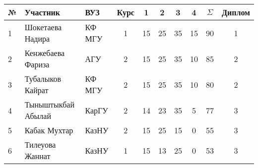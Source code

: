 \begin{center}
\begin{tabular}{|l|l|l|c|c|c|c|c|c|c|}
\hline
№ & Участник & ВУЗ & Курс & 1 & 2 & 3 & 4 & $\Sigma$ & Диплом \\
\hline
1 & Шокетаева Надира & КФ МГУ & 1 & 15 & 25 & 35 & 15 & 90 & 1 \\
\hline
2 & Кенжебаева Фариза & АГУ & 2 & 15 & 25 & 35 & 10 & 85 & 2 \\
\hline
3 & Тубалыков Кайрат & КФ МГУ & 2 & 15 & 25 & 35 & 10 & 80 & 2 \\
\hline
4 & Тыныштыкбай Абылай & КарГУ & 2 & 14 & 23 & 35 & 5 & 77 & 3 \\
\hline
5 & Кабак Мухтар & КазНУ & 2 & 15 & 25 & 15 & 0 & 55 & 3 \\
\hline
6 & Тилеуова Жаннат & КазНУ & 1 & 15 & 13 & 25 & 0 & 53 & 3 \\
\hline
\end{tabular}
\end{center}

